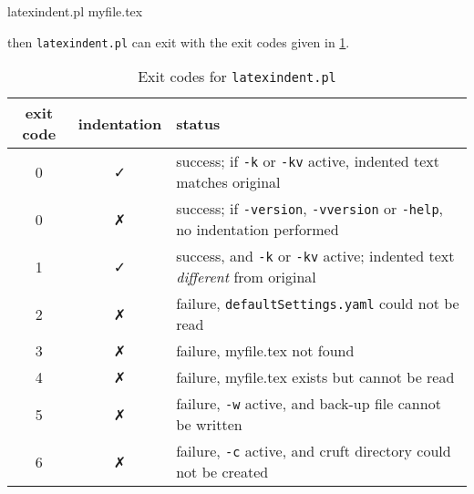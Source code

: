  \begin{commandshell}
latexindent.pl myfile.tex
\end{commandshell}

 then \texttt{latexindent.pl} can exit with the exit codes given in
 \cref{tab:exit-codes}.

 \begin{table}[!htb]
  \caption{Exit codes for \texttt{latexindent.pl}}
  \label{tab:exit-codes}
  \begin{tabular}{ccl}
   \toprule
   exit code & indentation & status                                                                                        \\
   \midrule
   0         & \faCheck    & success; if \texttt{-k} or \texttt{-kv} active, indented text matches original                \\
   0         & \faClose    & success; if \texttt{-version}, \texttt{-vversion} or \texttt{-help}, no indentation performed \\
   1         & \faCheck    & success, and \texttt{-k} or \texttt{-kv} active; indented text \emph{different} from original \\
   \midrule
   2         & \faClose    & failure, \texttt{defaultSettings.yaml} could not be read                                      \\
   3         & \faClose    & failure, myfile.tex not found                                                                 \\
   4         & \faClose    & failure, myfile.tex exists but cannot be read                                                 \\
   5         & \faClose    & failure, \texttt{-w} active, and back-up file cannot be written                               \\
   6         & \faClose    & failure, \texttt{-c} active, and cruft directory could not be created                         \\
   \bottomrule
  \end{tabular}
 \end{table}
